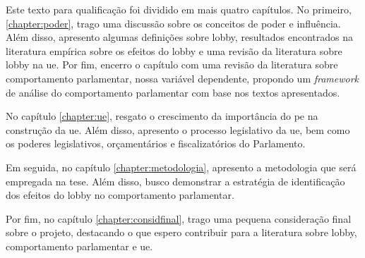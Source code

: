 Este texto para qualificação foi dividido em mais quatro capítulos. No primeiro, \ref{chapter:poder}, trago uma discussão sobre os conceitos de poder e influência. Além disso, apresento algumas definições sobre lobby, resultados encontrados na literatura empírica sobre os efeitos do lobby e uma revisão da literatura sobre lobby na \acrshort{ue}. Por fim, encerro o capítulo com uma revisão da literatura sobre comportamento parlamentar, nossa variável dependente, propondo um \textit{framework} de análise do comportamento parlamentar com base nos textos apresentados.

No capítulo \ref{chapter:ue}, resgato o crescimento da importância do \acrshort{pe} na construção da \acrshort{ue}. Além disso, apresento o processo legislativo da \acrshort{ue}, bem como os poderes legislativos, orçamentários e fiscalizatórios do Parlamento.

Em seguida, no capítulo \ref{chapter:metodologia}, apresento a metodologia que será empregada na tese. Além disso, busco demonstrar a estratégia de identificação dos efeitos do lobby no comportamento parlamentar.

Por fim, no capítulo \ref{chapter:considfinal}, trago uma pequena consideração final sobre o projeto, destacando o que espero contribuir para a literatura sobre lobby, comportamento parlamentar e \acrshort{ue}.